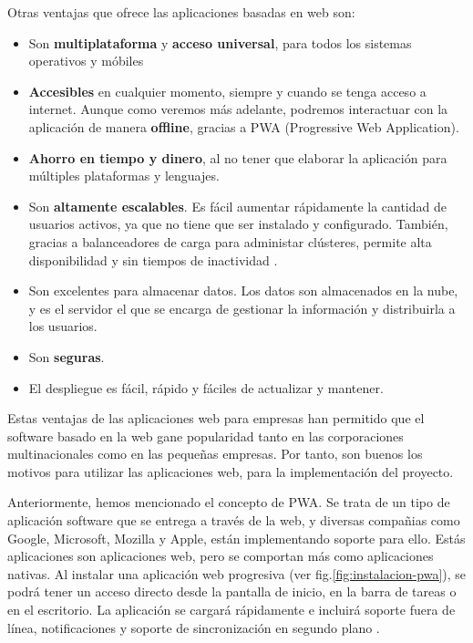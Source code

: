 \vspace{5mm}

\noindent Otras ventajas que ofrece las aplicaciones basadas en web son: 

\begin{itemize}
    \item Son \textbf{multiplataforma} y \textbf{acceso universal}, para todos los sistemas operativos y móbiles
    \item \textbf{Accesibles} en cualquier momento, siempre y cuando se tenga acceso a internet. Aunque como veremos 
    más adelante, podremos interactuar con la aplicación de manera \textbf{offline}, gracias a PWA (Progressive Web 
    Application).
    \item \textbf{Ahorro en tiempo y dinero}, al no tener que elaborar la aplicación para múltiples plataformas y 
    lenguajes.
    \item Son \textbf{altamente escalables}. Es fácil aumentar rápidamente la cantidad de usuarios activos, ya que 
    no tiene que ser instalado y configurado. También, gracias a balanceadores de carga para administar clústeres,
    permite alta disponibilidad y sin tiempos de inactividad \cite{swap}. 
    \item Son excelentes para almacenar datos. Los datos son almacenados en la nube, y es el servidor el que se 
    encarga de gestionar la información y distribuirla a los usuarios.
    \item Son \textbf{seguras}.
    \item El despliegue es fácil, rápido y fáciles de actualizar y mantener.
\end{itemize}

\noindent Estas ventajas de las aplicaciones web para empresas han permitido que el software basado en la web gane 
popularidad tanto en las corporaciones multinacionales como en las pequeñas empresas. Por tanto, son buenos los 
motivos para utilizar las aplicaciones web, para la implementación del proyecto.

\vspace{5mm}

\noindent Anteriormente, hemos mencionado el concepto de PWA. Se trata de un tipo de aplicación software que se entrega
a través de la web, y diversas compañias como Google, Microsoft, Mozilla y Apple, están implementando soporte para ello. 
Estás aplicaciones son aplicaciones web, pero se comportan más como aplicaciones nativas. Al instalar una aplicación 
web progresiva (ver fig.\ref{fig:instalacion-pwa}), se podrá tener un acceso directo desde la pantalla de inicio, en la 
barra de tareas o en el escritorio. La aplicación se cargará rápidamente e incluirá soporte fuera de línea, 
notificaciones y soporte de sincronización en segundo plano \cite{progressive-web-apps}. 

